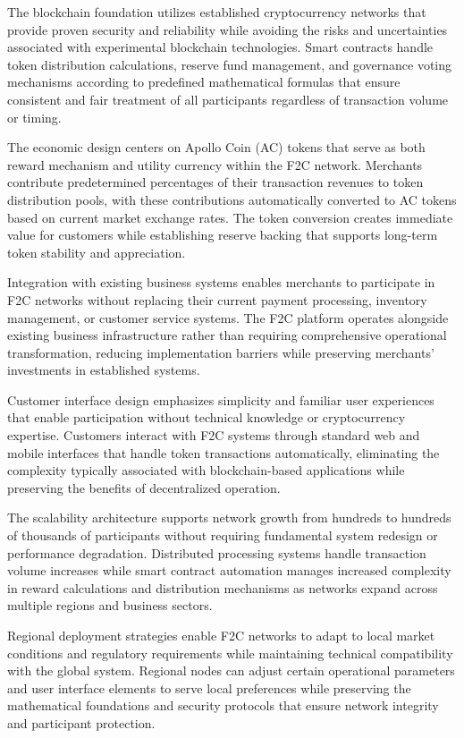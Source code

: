 \documentclass[
  Letterpaper,
]{scrbook}
\begin{document}
The blockchain foundation utilizes established cryptocurrency networks
that provide proven security and reliability while avoiding the risks
and uncertainties associated with experimental blockchain technologies.
Smart contracts handle token distribution calculations, reserve fund
management, and governance voting mechanisms according to predefined
mathematical formulas that ensure consistent and fair treatment of all
participants regardless of transaction volume or timing.

The economic design centers on Apollo Coin (AC) tokens that serve as
both reward mechanism and utility currency within the F2C network.
Merchants contribute predetermined percentages of their transaction
revenues to token distribution pools, with these contributions
automatically converted to AC tokens based on current market exchange
rates. The token conversion creates immediate value for customers while
establishing reserve backing that supports long-term token stability and
appreciation.

Integration with existing business systems enables merchants to
participate in F2C networks without replacing their current payment
processing, inventory management, or customer service systems. The F2C
platform operates alongside existing business infrastructure rather than
requiring comprehensive operational transformation, reducing
implementation barriers while preserving merchants' investments in
established systems.

Customer interface design emphasizes simplicity and familiar user
experiences that enable participation without technical knowledge or
cryptocurrency expertise. Customers interact with F2C systems through
standard web and mobile interfaces that handle token transactions
automatically, eliminating the complexity typically associated with
blockchain-based applications while preserving the benefits of
decentralized operation.

The scalability architecture supports network growth from hundreds to
hundreds of thousands of participants without requiring fundamental
system redesign or performance degradation. Distributed processing
systems handle transaction volume increases while smart contract
automation manages increased complexity in reward calculations and
distribution mechanisms as networks expand across multiple regions and
business sectors.

Regional deployment strategies enable F2C networks to adapt to local
market conditions and regulatory requirements while maintaining
technical compatibility with the global system. Regional nodes can
adjust certain operational parameters and user interface elements to
serve local preferences while preserving the mathematical foundations
and security protocols that ensure network integrity and participant
protection.
\end{document}
